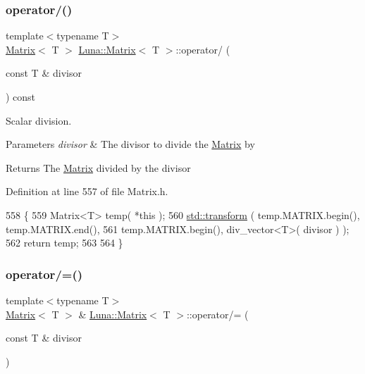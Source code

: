 \subsubsection{\texorpdfstring{operator/()}{operator/()}}
{\footnotesize\ttfamily template$<$typename T$>$ \\
\hyperlink{classLuna_1_1Matrix}{Matrix}$<$ T $>$ \hyperlink{classLuna_1_1Matrix}{Luna\+::\+Matrix}$<$ T $>$\+::operator/ (\begin{DoxyParamCaption}\item[{const T \&}]{divisor }\end{DoxyParamCaption}) const\hspace{0.3cm}{\ttfamily [inline]}}



Scalar division. 


\begin{DoxyParams}{Parameters}
{\em divisor} & The divisor to divide the \hyperlink{classLuna_1_1Matrix}{Matrix} by \\
\hline
\end{DoxyParams}
\begin{DoxyReturn}{Returns}
The \hyperlink{classLuna_1_1Matrix}{Matrix} divided by the divisor 
\end{DoxyReturn}


Definition at line 557 of file Matrix.\+h.


\begin{DoxyCode}
558   \{
559     Matrix<T> temp( *\textcolor{keyword}{this} );
560     \hyperlink{namespaceHeat__plot_aeaa6785bedcad63b4bd40e8cb1bad8a0}{std::transform} ( temp.MATRIX.begin(), temp.MATRIX.end(),
561                      temp.MATRIX.begin(), div\_vector<T>( divisor ) );
562     \textcolor{keywordflow}{return} temp;
563 
564   \}
\end{DoxyCode}
\mbox{\label{classLuna_1_1Matrix_a79ce127085c0157012b2d74dbc0b7f7e}} 
\subsubsection{\texorpdfstring{operator/=()}{operator/=()}}
{\footnotesize\ttfamily template$<$typename T$>$ \\
\hyperlink{classLuna_1_1Matrix}{Matrix}$<$ T $>$ \& \hyperlink{classLuna_1_1Matrix}{Luna\+::\+Matrix}$<$ T $>$\+::operator/= (\begin{DoxyParamCaption}\item[{const T \&}]{divisor }\end{DoxyParamCaption})\hspace{0.3cm}{\ttfamily [inline]}}




